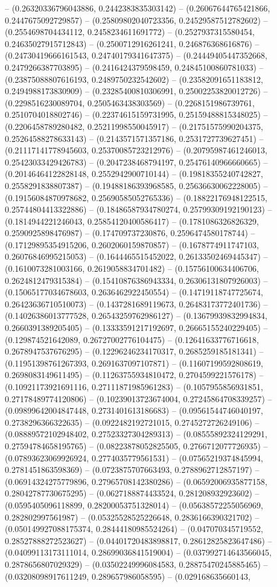 -- (0.26320336796043886, 0.2442383835303142) -- (0.26067644765421866, 0.2447675092729857) -- (0.25809802040723356, 0.24529587512782602) -- (0.2554698704434112, 0.2458234611691772) -- (0.2527937315580454, 0.24635027915712843) -- (0.2500712916261241, 0.246876368616876) -- (0.24730419666161543, 0.24740179341647375) -- (0.24449405447352668, 0.2479266387703895) -- (0.2416424379598459, 0.24845100860781033) -- (0.23875088807616193, 0.2489750232542602) -- (0.23582091651183812, 0.2494988173830909) -- (0.23285400810306991, 0.25002253820012726) -- (0.2298516230089704, 0.2505463438303569) -- (0.2268151986739761, 0.2510704018802746) -- (0.22374615159731995, 0.25159488815348025) -- (0.2206458789280482, 0.25211998550045917) -- (0.21751575990204375, 0.25264588278633143) -- (0.2143571571357186, 0.2531727739627451) -- (0.21117141778945603, 0.25370085723212976) -- (0.20795987461246013, 0.25423033429426783) -- (0.2047238468794197, 0.25476140966660665) -- (0.20146464122828148, 0.2552942900710144) -- (0.19818355240742827, 0.2558291838807387) -- (0.19488186393968585, 0.25636630062228005) -- (0.19156084870978682, 0.25690585052765336) -- (0.18822176948122515, 0.25744804413322886) -- (0.18486587934780274, 0.25799309192190123) -- (0.1814944221246043, 0.25854120400586417) -- (0.1781086326826329, 0.2590925898476987) -- (0.174709737230876, 0.2596474580178744) -- (0.17129895354915206, 0.2602060159870857) -- (0.1678774911747103, 0.26076846995215053) -- (0.1644465515452022, 0.26133502469445347) -- (0.1610073281003166, 0.2619058834701482) -- (0.15756100634406706, 0.2624812479315384) -- (0.15410876386943334, 0.26306131807926003) -- (0.15065177034678603, 0.2636462922450554) -- (0.14719118747725674, 0.26423636710510073) -- (0.1437281689119673, 0.26483173772401736) -- (0.14026386013777528, 0.26543259762986127) -- (0.13679939832994834, 0.2660391389205405) -- (0.13333591217192697, 0.26665155240229405) -- (0.129874521642089, 0.26727002776104475) -- (0.12641633776716618, 0.2678947537676295) -- (0.12296246234170317, 0.2685259185181341) -- (0.11951398761267393, 0.2691637097107871) -- (0.11607199592808619, 0.2698083149611495) -- (0.11263755934810472, 0.2704599221576178) -- (0.10921173921691116, 0.27111871985961283) -- (0.1057955856931851, 0.27178489774120806) -- (0.10239013723674004, 0.27245864708339257) -- (0.09899642004847448, 0.2731401613186683) -- (0.09561544746040197, 0.2738296366322635) -- (0.0922482192721015, 0.2745272726249106) -- (0.08889572102948402, 0.27523327304289313) -- (0.08555892324129291, 0.27594784658195765) -- (0.08223878052825505, 0.2766712077726935) -- (0.07893623069926924, 0.2774035779561531) -- (0.07565219374845994, 0.2781451863598369) -- (0.0723875707663493, 0.2788962712857197) -- (0.06914324275779896, 0.27965708142380286) -- (0.06592006935877158, 0.28042787730675295) -- (0.0627188874433524, 0.281208932923602) -- (0.0595405096118899, 0.28200053751328014) -- (0.05638572255056969, 0.282802997561987) -- (0.05325528525226648, 0.2836166390321702) -- (0.050149927088175374, 0.28444180985524264) -- (0.047070345719552, 0.28527888272523627) -- (0.04401720483898817, 0.28612825823647486) -- (0.04099113173111014, 0.28699036841519004) -- (0.037992714643566045, 0.2878656807029329) -- (0.03502249996084583, 0.28875470245885465) -- (0.03208098917611249, 0.289657986058595) -- (0.029168635660143, 